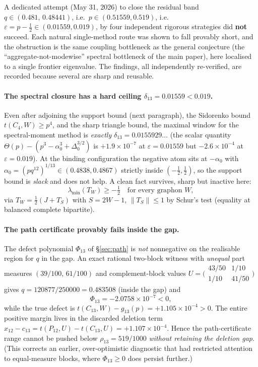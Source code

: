 \documentclass[11pt]{article}
\newcommand{\eps}{\varepsilon}
\begin{document}
A dedicated attempt (May 31, 2026) to close the residual band
$q\in(0.481,\,0.48441)$, i.e.\ $p\in(0.51559,0.519)$, i.e.\ $\eps=p-\tfrac12\in(0.01559,0.019)$,
by four independent rigorous strategies did \textbf{not} succeed.  Each natural single-method
route was shown to fall provably short, and the obstruction is the same coupling bottleneck as
the general conjecture (the ``aggregate-not-modewise'' spectral bottleneck of the main paper),
here localised to a single frontier eigenvalue.  The findings, all independently re-verified, are recorded because
several are sharp and reusable.

\paragraph{The spectral closure has a hard ceiling $\delta_{13}=0.01559<0.019$.}
Even after adjoining the support bound (next paragraph), the Sidorenko bound
$t(C_4,W)\ge p^4$, and the sharp triangle bound, the maximal window for the spectral-moment method
is \emph{exactly} $\delta_{13}=0.0155929\ldots$ (the scalar quantity $\Theta(p)-(p^3-\alpha_0^3+
\Delta_0^{3/2})$ is $+1.9\times10^{-7}$ at $\eps=0.01559$ but $-2.6\times10^{-4}$ at $\eps=0.019$).
At the binding configuration the negative atom sits at $-\alpha_0$ with $\alpha_0=(pq^{12})^{1/13}
\in(0.4838,0.4867)$ strictly inside $(-\tfrac12,\tfrac12)$, so the support bound is \emph{slack} and
does not help.  A clean fact survives, sharp but inactive here:
\[
        \lambda_{\min}(T_W)\ge-\tfrac12\quad\text{for every graphon }W,
\]
via $T_W=\tfrac12(J+T_S)$ with $S=2W-1$, $\|T_S\|\le1$ by Schur's test (equality at balanced
complete bipartite).

\paragraph{The path certificate provably fails inside the gap.}
The defect polynomial $\Phi_{13}$ of \S\ref{sec:path} is \emph{not} nonnegative on the
realisable region for $q$ in the gap.  An exact rational two-block witness with \emph{unequal}
part measures $(39/100,\,61/100)$ and complement-block values
$U=\bigl(\begin{smallmatrix}43/50&1/10\\1/10&41/50\end{smallmatrix}\bigr)$ gives
$q=120877/250000=0.483508$ (inside the gap) and
\[
        \Phi_{13}=-2.0758\times10^{-7}<0,
\]
while the true defect is $t(C_{13},W)-g_{13}(p)=+1.105\times10^{-4}>0$.  The entire positive margin
lives in the discarded deletion term $x_{12}-c_{13}=t(P_{12},U)-t(C_{13},U)=+1.107\times10^{-4}$.
Hence the path-certificate range cannot be pushed below $\rho_{13}=519/1000$ \emph{without retaining
the deletion gap}.  (This corrects an earlier, over-optimistic diagnostic that had restricted
attention to equal-measure blocks, where $\Phi_{13}\ge0$ does persist further.)
\end{document}
